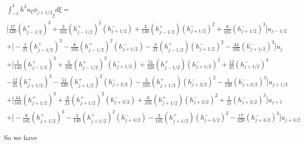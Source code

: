 \documentclass[12pt]{article}
\begin{document}
\begin{multline*}
\int_{-1}^{1}h^3u_{\xi}{\phi_{j+1/2}}_\xi d\xi  = \\
\bigg[\frac{17}{420}\left(h^+_{j - 1/2}\right)^3 + \frac{3}{105} \left(h^+_{j - 1/2}\right)^2 \left(h^-_{j + 1/2}\right)
+  \frac{3}{140} \left(h^+_{j - 1/2}\right) \left(h^-_{j + 1/2}\right)^2 +  \frac{8}{105}\left(h^-_{j + 1/2}\right)^3 \bigg] u_{j - 1/2} \\
+ \bigg[-\frac{1}{21}\left(h^+_{j - 1/2}\right)^3 - \frac{6}{105} \left(h^+_{j - 1/2}\right)^2 \left(h^-_{j + 1/2}\right)
- \frac{3}{21} \left(h^+_{j - 1/2}\right) \left(h^-_{j + 1/2}\right)^2 - \frac{44}{105}  \left(h^-_{j + 1/2}\right)^3 \bigg] u_{j} \\
+
\bigg[ \frac{1}{140} \left(h^+_{j - 1/2}\right)^3 + \frac{3}{105} \left(h^+_{j - 1/2}\right)^2 \left(h^-_{j + 1/2}\right)
+ \frac{51}{420} \left(h^+_{j - 1/2}\right) \left(h^-_{j + 1/2}\right)^2 +   \frac{12}{35}\left(h^-_{j + 1/2}\right)^3 \\ - \frac{12}{35} \left(h^+_{j + 1/2} \right)^3  - \frac{51}{420}  \left(h^+_{j + 1/2} \right)^2\left(h^-_{j + 3/2}\right)   - \frac{3}{105}\left(h^+_{j + 1/2} \right)\left(h^-_{j + 3/2}\right)^2  - \frac{1}{140}\left(h^-_{j + 3/2}\right)^3 \bigg] u_{j + 1/2} \\
+\bigg[\frac{44}{105}\left(h^+_{j + 1/2} \right)^3 + \frac{3}{21} \left(h^+_{j + 1/2} \right)^2\left(h^-_{j + 3/2}\right) + \frac{6}{105} \left(h^+_{j + 1/2} \right)\left(h^-_{j + 3/2}\right)^2 + \frac{1}{21}\left(h^-_{j + 3/2}\right)^3 \bigg] u_{j +1} \\
+ \bigg[- \frac{8}{105}\left(h^+_{j + 1/2} \right)^3 - \frac{3}{140} \left(h^+_{j + 1/2} \right)^2\left(h^-_{j + 3/2}\right) - \frac{3}{105} \left(h^+_{j + 1/2} \right)\left(h^-_{j + 3/2}\right)^2 - \frac{17}{420} \left(h^-_{j + 3/2}\right)^3 \bigg] u_{j + 3/2} 
\end{multline*}

So we have
\end{document}
